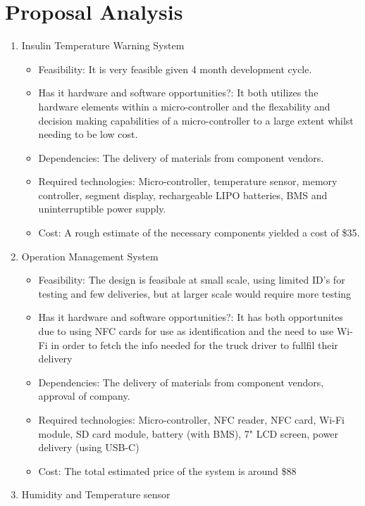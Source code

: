 \chapter{Proposal Analysis}
\begin{enumerate}
  \item Insulin Temperature Warning System
        \begin{itemize}
          \item Feasibility: It is very feasible given 4 month development cycle.
          \item Has it hardware and software opportunities?: It both utilizes the hardware elements within a micro-controller and the flexability and decision making capabilities of a micro-controller to a large extent whilst needing to be low cost.
          \item Dependencies: The delivery of materials from component vendors.
          \item Required technologies: Micro-controller, temperature sensor, memory controller, segment display, rechargeable LIPO batteries, BMS and uninterruptible power supply.
          \item Cost: A rough estimate of the necessary components yielded a cost of \$35.
        \end{itemize}
	\item Operation Management System
	\begin{itemize}
	 \item Feasibility: The design is feasibale at small scale, using limited ID's for testing and few deliveries, but at larger scale would require more testing
          \item Has it hardware and software opportunities?: It has both opportunites due to using NFC cards for use as identification and the need to use Wi-Fi in order to fetch the info needed for the truck driver to fullfil their delivery
          \item Dependencies: The delivery of materials from component vendors, approval of company.
          \item Required technologies: Micro-controller, NFC reader, NFC card, Wi-Fi module, SD card module, battery (with BMS), 7" LCD screen, power delivery (using USB-C)
          \item Cost: The total estimated price of the system is around \$88
	\end{itemize}
        \item Humidity and Temperature sensor
        \begin{itemize}

\end{itemize}
\end{enumerate}
